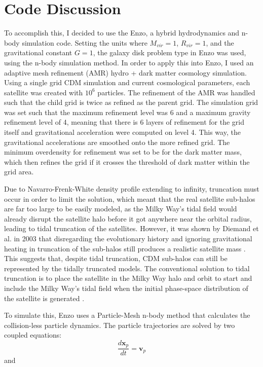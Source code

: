 \documentclass{article}
\begin{document}
\section{Code Discussion}
To accomplish this, I decided to use the Enzo, a hybrid hydrodynamics and n-body simulation code. Setting the units where $M_{vir} = 1$, $R_{vir}  = 1$, and the gravitational constant $G = 1$, the galaxy disk problem type in Enzo was used, using the n-body simulation method. In order to apply this into Enzo, I used an adaptive mesh refinement (AMR) hydro + dark matter cosmology simulation. Using a single grid CDM simulation and current cosmological parameters, each satellite was created with $10^6$ particles. The refinement of the AMR was handled such that the child grid is twice as refined as the parent grid. The simulation grid was set such that the maximum refinement level was 6 and a maximum gravity refinement level of 4, meaning that there is 6 layers of refinement for the grid itself and gravitational acceleration were computed on level 4. This way, the gravitational accelerations are smoothed onto the more refined grid. The minimum overdensity for refinement was set to be for the dark matter mass, which then refines the grid if it crosses the threshold of dark matter within the grid area.

Due to Navarro-Frenk-White density profile extending to infinity, truncation must occur in order to limit the solution, which meant that the real satellite sub-halos are far too large to be easily modeled, as the Milky Way's tidal field would already disrupt the satellite halo before it got anywhere near the orbital radius, leading to tidal truncation of the satellites. However, it was shown by Diemand et al. in 2003 that disregarding the evolutionary history and ignoring gravitational heating in truncation of the sub-halos still produces a realistic satellite mass \cite{truncationOfHalos}. This suggests that, despite tidal truncation, CDM sub-halos can still be represented by the tidally truncated models. The conventional solution to tidal truncation  is to place the satellite in the Milky Way halo and orbit to start and include the Milky Way's tidal field when the initial phase-space distribution of the satellite is generated \cite{dymanicsOfTidalTails}.

To simulate this, Enzo uses a Particle-Mesh n-body method that calculates the collision-less particle dynamics. The particle trajectories are solved by two coupled equations: 
\[
\frac{d \mathbf{x}_p}{dt} = \mathbf{v}_p
\]
and
\end{document}
